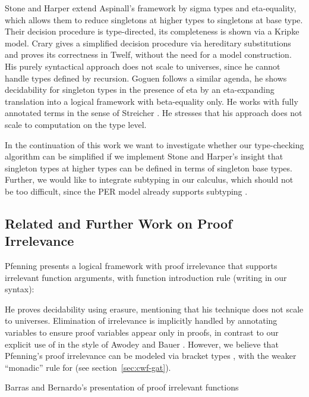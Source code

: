 \documentclass{LMCS}
\begin{document}
Stone and Harper \cite{stoneHarper:tocl06} extend Aspinall's framework
by sigma types and eta-equality, which allows them to reduce
singletons at higher types to singletons at base type.  Their decision
procedure is type-directed, its completeness is shown via a Kripke
model.  Crary \cite{crary:lfmtp08} gives a simplified decision
procedure via hereditary substitutions and proves its correctness in
Twelf, without the need for a model construction.  His purely
syntactical approach does not scale to universes, since he cannot
handle types defined by recursion.  Goguen \cite{goguen:syntacticEta}
follows a similar agenda, he shows decidability for singleton types
in the presence of eta by an eta-expanding translation into a logical
framework with beta-equality only.  He works with fully annotated
terms in the sense of Streicher \cite{streicher:PhD}.  He stresses
that his approach does not scale to computation on the type level.

In the continuation of this work we want to investigate whether our
type-checking algorithm can be simplified if we implement Stone and
Harper's insight that singleton types at higher types can be defined
in terms of singleton base types.  Further, we would like to integrate
subtyping in our calculus, which should not be too difficult, since
the PER model already supports subtyping
\cite{aspinall:csl94,coquandPollackTakeyama:fundinf05}. 


\subsection{Related and Further Work on Proof Irrelevance}

Pfenning \cite{pfenning:intextirr} presents a logical framework with
proof irrelevance that supports irrelevant function arguments,
with function introduction rule 
(writing  in our syntax):  

He proves decidability using erasure, mentioning that
his technique does not scale to universes.  
Elimination of irrelevance is implicitly handled by annotating
variables to ensure proof variables 
appear only in proofs,
in contrast to our explicit use of  in the style of Awodey and Bauer
\cite{awodeyBauer:propositionsAsTypes}.  However, we believe that
Pfenning's proof irrelevance can be modeled via bracket types 
, with the weaker ``monadic'' rule for  (see
section~\ref{sec:cwf-gat}). 

Barras and Bernardo's \cite{DBLP:conf/fossacs/BarrasB08} presentation of
proof irrelevant functions
\end{document}
